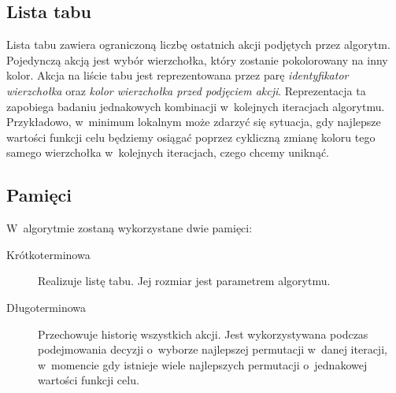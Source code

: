 \subsection{Lista tabu}
Lista tabu zawiera ograniczoną liczbę ostatnich akcji podjętych przez algorytm.
Pojedynczą akcją jest wybór wierzchołka, który zostanie pokolorowany na inny kolor.
Akcja na liście tabu jest reprezentowana przez parę \emph{identyfikator wierzchołka} oraz \emph{kolor wierzchołka przed podjęciem akcji}. 
Reprezentacja ta zapobiega badaniu jednakowych kombinacji w~kolejnych iteracjach algorytmu. Przykładowo, w~minimum lokalnym może zdarzyć się sytuacja, gdy najlepsze wartości funkcji celu będziemy osiągać poprzez cykliczną zmianę koloru tego samego wierzchołka w~kolejnych iteracjach, czego chcemy uniknąć.

\subsection{Pamięci}

W~algorytmie zostaną wykorzystane dwie pamięci:

\begin{description}
 \item [Krótkoterminowa] Realizuje listę tabu. Jej rozmiar jest parametrem algorytmu.
 \item [Długoterminowa] Przechowuje historię wszystkich akcji. Jest wykorzystywana podczas podejmowania decyzji o~wyborze najlepszej permutacji w~danej iteracji, w~momencie gdy istnieje wiele najlepszych permutacji o~jednakowej wartości funkcji celu.
\end{description}
